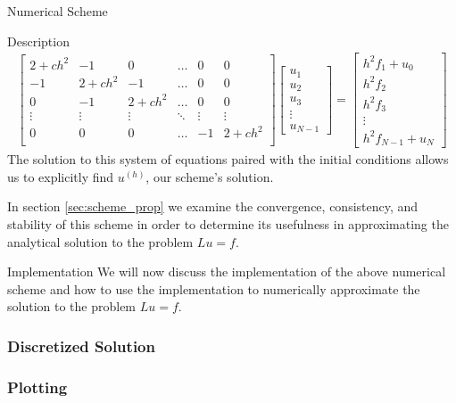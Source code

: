 \documentclass{article}
\begin{document}
\begin{section}{Numerical Scheme}
\begin{subsection}{Description}
\begin{align*}
      \begin{bmatrix}
        2 + ch^2 & -1 & 0 & \hdots & 0 & 0\\
        -1 & 2 + ch^2 & -1 & \hdots & 0 & 0\\
        0 & -1 & 2 + ch^2 & \hdots & 0 & 0\\
        \vdots & \vdots & \vdots & \ddots & \vdots & \vdots \\
        0 & 0 & 0 & \hdots & -1 & 2+ch^2 \\
      \end{bmatrix}
      \begin{bmatrix}
        u_1 \\
        u_2 \\
        u_3 \\
        \vdots \\
        u_{N-1}
      \end{bmatrix}
      =
      \begin{bmatrix}
        h^2 f_1 + u_0 \\
        h^2 f_2 \\
        h^2 f_3 \\
        \vdots \\
        h^2 f_{N-1} + u_{N}
      \end{bmatrix}
    \end{align*}
    The solution to this system of equations paired with the initial conditions
    allows us to explicitly find $u^{(h)}$, our scheme's solution.

    In section \ref{sec:scheme_prop} we examine the convergence, consistency,
    and stability of this scheme in order to determine its usefulness in
    approximating the analytical solution to the problem $Lu = f$.
  \end{subsection}

  \begin{subsection}{Implementation}
    We will now discuss the implementation of the above numerical scheme and
    how to use the implementation to numerically approximate the solution to the
    problem $Lu = f$.
    \subsubsection{Discretized Solution}

    \subsubsection{Plotting}

  \end{subsection}

\end{section}
\end{document}
